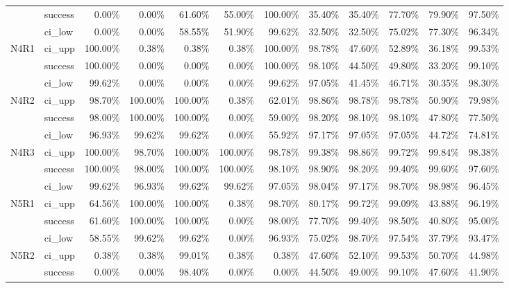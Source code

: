 \begin{tabular}{llrrrrrrrrrr}
     & success &       0.00\% &   0.00\% &  61.60\% &  55.00\% & 100.00\% &       35.40\% & 35.40\% & 77.70\% & 79.90\% & 97.50\% \\
     & ci\_low &       0.00\% &   0.00\% &  58.55\% &  51.90\% &  99.62\% &       32.50\% & 32.50\% & 75.02\% & 77.30\% & 96.34\% \\
N4R1 & ci\_upp &     100.00\% &   0.38\% &   0.38\% &   0.38\% & 100.00\% &       98.78\% & 47.60\% & 52.89\% & 36.18\% & 99.53\% \\
     & success &     100.00\% &   0.00\% &   0.00\% &   0.00\% & 100.00\% &       98.10\% & 44.50\% & 49.80\% & 33.20\% & 99.10\% \\
     & ci\_low &      99.62\% &   0.00\% &   0.00\% &   0.00\% &  99.62\% &       97.05\% & 41.45\% & 46.71\% & 30.35\% & 98.30\% \\
N4R2 & ci\_upp &      98.70\% & 100.00\% & 100.00\% &   0.38\% &  62.01\% &       98.86\% & 98.78\% & 98.78\% & 50.90\% & 79.98\% \\
     & success &      98.00\% & 100.00\% & 100.00\% &   0.00\% &  59.00\% &       98.20\% & 98.10\% & 98.10\% & 47.80\% & 77.50\% \\
     & ci\_low &      96.93\% &  99.62\% &  99.62\% &   0.00\% &  55.92\% &       97.17\% & 97.05\% & 97.05\% & 44.72\% & 74.81\% \\
N4R3 & ci\_upp &     100.00\% &  98.70\% & 100.00\% & 100.00\% &  98.78\% &       99.38\% & 98.86\% & 99.72\% & 99.84\% & 98.38\% \\
     & success &     100.00\% &  98.00\% & 100.00\% & 100.00\% &  98.10\% &       98.90\% & 98.20\% & 99.40\% & 99.60\% & 97.60\% \\
     & ci\_low &      99.62\% &  96.93\% &  99.62\% &  99.62\% &  97.05\% &       98.04\% & 97.17\% & 98.70\% & 98.98\% & 96.45\% \\
N5R1 & ci\_upp &      64.56\% & 100.00\% & 100.00\% &   0.38\% &  98.70\% &       80.17\% & 99.72\% & 99.09\% & 43.88\% & 96.19\% \\
     & success &      61.60\% & 100.00\% & 100.00\% &   0.00\% &  98.00\% &       77.70\% & 99.40\% & 98.50\% & 40.80\% & 95.00\% \\
     & ci\_low &      58.55\% &  99.62\% &  99.62\% &   0.00\% &  96.93\% &       75.02\% & 98.70\% & 97.54\% & 37.79\% & 93.47\% \\
N5R2 & ci\_upp &       0.38\% &   0.38\% &  99.01\% &   0.38\% &   0.38\% &       47.60\% & 52.10\% & 99.53\% & 50.70\% & 44.98\% \\
     & success &       0.00\% &   0.00\% &  98.40\% &   0.00\% &   0.00\% &       44.50\% & 49.00\% & 99.10\% & 47.60\% & 41.90\% \\

\end{tabular}
